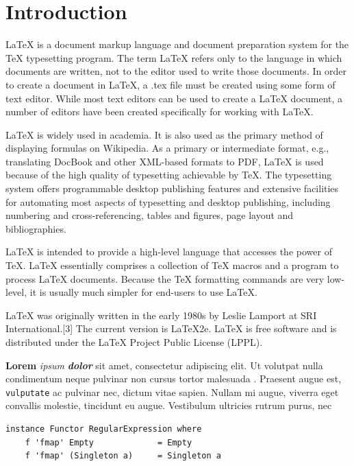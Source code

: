 \section{Introduction}

LaTeX is a document markup language and document preparation system for
the TeX typesetting program. The term LaTeX refers only to the language
in which documents are written, not to the editor used to write those
documents. In order to create a document in LaTeX, a .tex file must be
created using some form of text editor. While most text editors can be
used to create a LaTeX document, a number of editors have been created
specifically for working with LaTeX.

LaTeX is widely used in academia. It is also used as the primary method
of displaying formulas on Wikipedia. As a primary or intermediate
format, e.g., translating DocBook and other XML-based formats to PDF,
LaTeX is used because of the high quality of typesetting achievable by
TeX. The typesetting system offers programmable desktop publishing
features and extensive facilities for automating most aspects of
typesetting and desktop publishing, including numbering and
cross-referencing, tables and figures, page layout and bibliographies.

LaTeX is intended to provide a high-level language that accesses the
power of TeX. LaTeX essentially comprises a collection of TeX macros and
a program to process LaTeX documents. Because the TeX formatting
commands are very low-level, it is usually much simpler for end-users to
use LaTeX.

LaTeX was originally written in the early 1980s by Leslie Lamport at SRI
International.{[}3{]} The current version is LaTeX2e. LaTeX is free
software and is distributed under the LaTeX Project Public License
(LPPL).

\textbf{Lorem} \emph{ipsum} \textbf{\emph{dolor}} sit amet, consectetur
adipiscing elit. Ut volutpat nulla condimentum neque pulvinar non cursus
tortor malesuada \citep{halevy2009unreasonable}. Praesent augue est,
\texttt{vulputate} ac pulvinar nec, dictum vitae sapien. Nullam mi
augue, viverra eget convallis molestie, tincidunt eu augue. Vestibulum
ultricies rutrum purus, nec

\begin{minipage}{0.95\textwidth}\begin{lstlisting}
instance Functor RegularExpression where
    f 'fmap' Empty             = Empty
    f 'fmap' (Singleton a)     = Singleton a
\end{lstlisting}\end{minipage}


